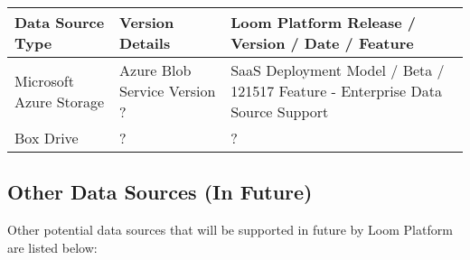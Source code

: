 \documentclass[letterpaper,10pt,english]{sphinxmanual}
\begin{document}
\begin{savenotes}\sphinxattablestart
\centering
\begin{tabulary}{\linewidth}[t]{|T|T|T|}
\hline

Data Source
Type
&
Version Details
&
Loom Platform Release / Version / Date / Feature
\\
\hline
Microsoft
Azure Storage
&
Azure Blob Service
Version ?
&
SaaS Deployment Model / Beta / 121517
Feature - Enterprise Data Source Support
\\
\hline
Box Drive
&
?
&
?
\\
\hline
\end{tabulary}
\par
\sphinxattableend\end{savenotes}


\subsection{Other Data Sources (In Future)}
\label{\detokenize{loom_getting_started_guide:other-data-sources-in-future}}\label{\detokenize{loom_getting_started_guide:future-data-sources}}
Other potential data sources that will be supported in future by Loom Platform are listed below:
\end{document}
